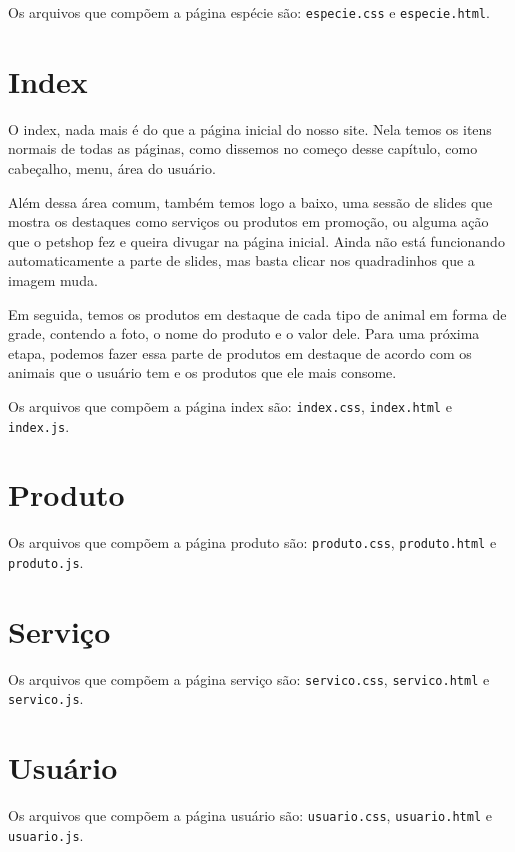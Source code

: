 Os arquivos que compõem a página espécie são: \texttt{especie.css} e \texttt{especie.html}.

\section{Index}
O index, nada mais é do que a página inicial do nosso site. Nela temos os itens normais de todas as
páginas, como dissemos no começo desse capítulo, como cabeçalho, menu, área do usuário.

Além dessa área comum, também temos logo a baixo, uma sessão de slides que mostra os destaques como
serviços ou produtos em promoção, ou alguma ação que o petshop fez e queira divugar na página inicial.
Ainda não está funcionando automaticamente a parte de slides, mas basta clicar nos quadradinhos que a
imagem muda.

Em seguida, temos os produtos em destaque de cada tipo de animal em forma de grade, contendo a foto,
o nome do produto e o valor dele. Para uma próxima etapa, podemos fazer essa parte de produtos em
destaque de acordo com os animais que o usuário tem e os produtos que ele mais consome.

Os arquivos que compõem a página index são: \texttt{index.css}, \texttt{index.html} e
\texttt{index.js}.

\section{Produto}

Os arquivos que compõem a página produto são: \texttt{produto.css}, \texttt{produto.html} e
\texttt{produto.js}.

\section{Serviço}

Os arquivos que compõem a página serviço são: \texttt{servico.css}, \texttt{servico.html} e
\texttt{servico.js}.

\section{Usuário}

Os arquivos que compõem a página usuário são: \texttt{usuario.css}, \texttt{usuario.html} e
\texttt{usuario.js}.
